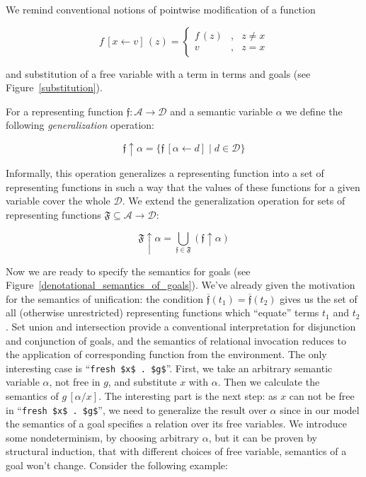 We remind conventional notions of pointwise modification of a function

\[
f\,[x\gets v]\,(z)=\left\{
\begin{array}{rcl}
  f\,(z) &,& z \ne x \\
  v      &,& z = x
\end{array}
\right.
\]

and substitution of a free variable with a term in terms and goals (see Figure~\ref{substitution}).

For a representing function $\mathfrak{f}:\mathcal{A}\to\mathcal{D}$ and a semantic variable $\alpha$ we define
the following \emph{generalization} operation:

\[
\mathfrak{f}\uparrow\alpha = \{ \mathfrak{f}\,[\alpha\gets d] \mid d\in\mathcal D\}
\]

Informally, this operation generalizes a representing function into a set of representing functions in such a way that the
values of these functions for a given variable cover the whole $\mathcal{D}$. We extend the generalization operation for sets of
representing functions $\mathfrak{F}\subseteq\mathcal{A}\to\mathcal{D}$:

\[
  \mathfrak{F}\uparrow\alpha = \bigcup_{\mathfrak{f}\in\mathfrak{F}}(\mathfrak{f}\uparrow\alpha)
\]

Now we are ready to specify the semantics for goals (see Figure~\ref{denotational_semantics_of_goals}). We've already given the motivation for
the semantics of unification: the condition $\overline{\mathfrak{f}}(t_1)=\overline{\mathfrak{f}}(t_2)$ gives us the set of all (otherwise
unrestricted) representing functions which ``equate'' terms $t_1$ and $t_2$. Set union and intersection provide a conventional interpretation
for disjunction and conjunction of goals, and the semantics of relational invocation reduces to the application of corresponding
function from the environment. The only interesting case is ``\lstinline|fresh $x$ . $g$|''. First, we take an arbitrary semantic variable $\alpha$,
not free in $g$, and substitute $x$ with $\alpha$. Then we calculate the semantics of $g\,[\alpha/x]$. The interesting part is the next step:
as $x$ can not be free in ``\lstinline|fresh $x$ . $g$|'', we need to generalize the result over $\alpha$ since in our model the semantics of a
goal specifies a relation over its free variables. We introduce some nondeterminism, by choosing arbitrary $\alpha$, but it can be proven by structural induction, that with different choices of free variable, semantics of a goal won't change. Consider the following example:

